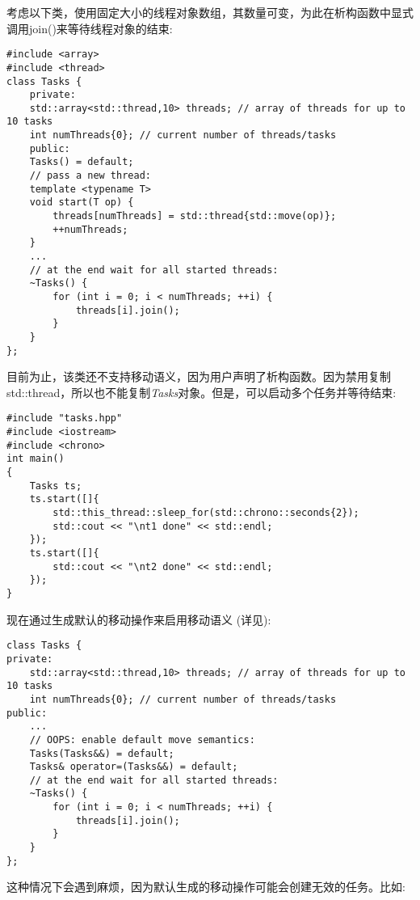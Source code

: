 考虑以下类，使用固定大小的线程对象数组，其数量可变，为此在析构函数中显式调用join()来等待线程对象的结束:\par

{\color{red}{basics/tasks.hpp}}\par

\begin{lstlisting}[caption={}]
#include <array>
#include <thread>
class Tasks {
	private:
	std::array<std::thread,10> threads; // array of threads for up to 10 tasks
	int numThreads{0}; // current number of threads/tasks
	public:
	Tasks() = default;
	// pass a new thread:
	template <typename T>
	void start(T op) {
		threads[numThreads] = std::thread{std::move(op)};
		++numThreads;
	}
	...
	// at the end wait for all started threads:
	~Tasks() {
		for (int i = 0; i < numThreads; ++i) {
			threads[i].join();
		}
	}
};
\end{lstlisting}

目前为止，该类还不支持移动语义，因为用户声明了析构函数。因为禁用复制std::thread，所以也不能复制\textit{Tasks}对象。但是，可以启动多个任务并等待结束:\par

{\color{red}{basics/tasks.cpp}}\par

\begin{lstlisting}[caption={}]
#include "tasks.hpp"
#include <iostream>
#include <chrono>
int main()
{
	Tasks ts;
	ts.start([]{
		std::this_thread::sleep_for(std::chrono::seconds{2});
		std::cout << "\nt1 done" << std::endl;
	});
	ts.start([]{
		std::cout << "\nt2 done" << std::endl;
	});
}
\end{lstlisting}

现在通过生成默认的移动操作来启用移动语义
(详见{\color{red}{basics/tasksbug.cpp}}):\par

\begin{lstlisting}[caption={}]
class Tasks {
private:
	std::array<std::thread,10> threads; // array of threads for up to 10 tasks
	int numThreads{0}; // current number of threads/tasks
public:
	...
	// OOPS: enable default move semantics:
	Tasks(Tasks&&) = default;
	Tasks& operator=(Tasks&&) = default;
	// at the end wait for all started threads:
	~Tasks() {
		for (int i = 0; i < numThreads; ++i) {
			threads[i].join();
		}
	}
};
\end{lstlisting}

这种情况下会遇到麻烦，因为默认生成的移动操作可能会创建无效的任务。比如:\par

